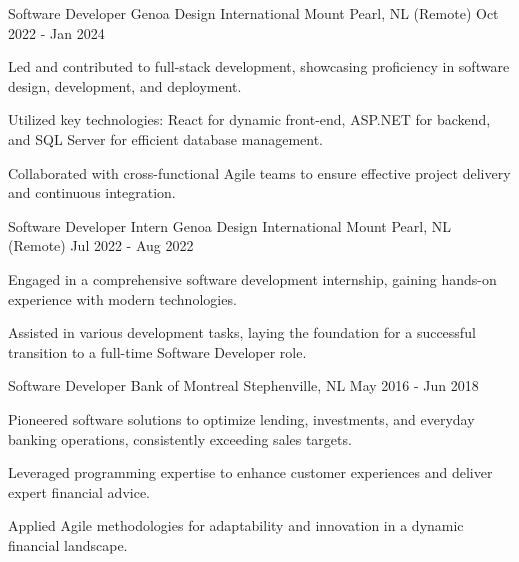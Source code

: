 
\begin{cventries}
	
	\cventry
	{Software Developer} %
	{Genoa Design International} %
	{Mount Pearl, NL (Remote)} %
	{Oct 2022 - Jan 2024} %
	{
		\begin{cvitems} %
			\item {Led and contributed to full-stack development, showcasing proficiency in software design, development, and deployment.}
			\item {Utilized key technologies: React for dynamic front-end, ASP.NET for backend, and SQL Server for efficient database management.}
			\item {Collaborated with cross-functional Agile teams to ensure effective project delivery and continuous integration.}
		\end{cvitems}
	}
	
	\cventry
	{Software Developer Intern} %
	{Genoa Design International} %
	{Mount Pearl, NL (Remote)} %
	{Jul 2022 - Aug 2022} %
	{
		\begin{cvitems} %
			\item {Engaged in a comprehensive software development internship, gaining hands-on experience with modern technologies.}
			\item {Assisted in various development tasks, laying the foundation for a successful transition to a full-time Software Developer role.}
		\end{cvitems}
	}
	
	\cventry
	{Software Developer} %
	{Bank of Montreal} %
	{Stephenville, NL} %
	{May 2016 - Jun 2018} %
	{
		\begin{cvitems} %
			\item {Pioneered software solutions to optimize lending, investments, and everyday banking operations, consistently exceeding sales targets.}
			\item {Leveraged programming expertise to enhance customer experiences and deliver expert financial advice.}
			\item {Applied Agile methodologies for adaptability and innovation in a dynamic financial landscape.}
		\end{cvitems}
	}
	

\end{cventries}
